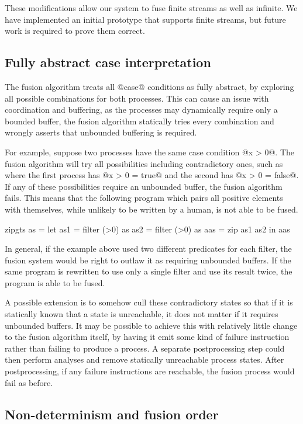 These modifications allow our system to fuse finite streams as well as infinite.
We have implemented an initial prototype that supports finite streams, but future work is required to prove them correct.

\subsection{Fully abstract case interpretation}
\label{s:FullyAbstractCase}

The fusion algorithm treats all @case@ conditions as fully abstract, by exploring all possible combinations for both processes.
This can cause an issue with coordination and buffering, as the processes may dynamically require only a bounded buffer, the fusion algorithm statically tries every combination and wrongly asserts that unbounded buffering is required.

For example, suppose two processes have the same case condition @x > 0@.
The fusion algorithm will try all possibilities including contradictory ones, such as where the first process has @x > 0 = true@ and the second has @x > 0 = false@.
If any of these possibilities require an unbounded buffer, the fusion algorithm fails.
This means that the following program which pairs all positive elements with themselves, while unlikely to be written by a human, is not able to be fused.
\begin{code}
zipgts as =
  let as1 = filter (>0) as
      as2 = filter (>0) as
      aas = zip as1 as2
  in  aas
\end{code}

In general, if the example above used two different predicates for each filter, the fusion system would be right to outlaw it as requiring unbounded buffers.
If the same program is rewritten to use only a single filter and use its result twice, the program is able to be fused.

A possible extension is to somehow cull these contradictory states so that if it is statically known that a state is unreachable, it does not matter if it requires unbounded buffers.
It may be possible to achieve this with relatively little change to the fusion algorithm itself, by having it emit some kind of failure instruction rather than failing to produce a process.
A separate postprocessing step could then perform analyses and remove statically unreachable process states.
After postprocessing, if any failure instructions are reachable, the fusion process would fail as before.

\subsection{Non-determinism and fusion order}
\label{s:FusionOrder}

